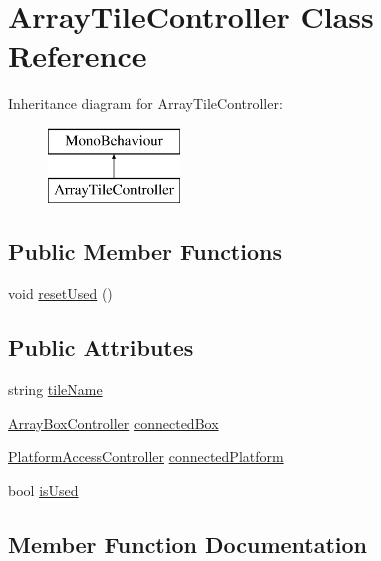 \hypertarget{class_array_tile_controller}{}\section{Array\+Tile\+Controller Class Reference}
\label{class_array_tile_controller}
Inheritance diagram for Array\+Tile\+Controller\+:\begin{figure}[H]
\begin{center}
\leavevmode
\includegraphics[height=2.000000cm]{class_array_tile_controller}
\end{center}
\end{figure}
\subsection*{Public Member Functions}
\begin{DoxyCompactItemize}
\item 
void \hyperlink{class_array_tile_controller_ab8f5d31d582f80a87d6e7ffca8dd9dce}{reset\+Used} ()
\end{DoxyCompactItemize}
\subsection*{Public Attributes}
\begin{DoxyCompactItemize}
\item 
string \hyperlink{class_array_tile_controller_a9f7d6d4fd87723a3e91209f35bc8d5f6}{tile\+Name}
\item 
\hyperlink{class_array_box_controller}{Array\+Box\+Controller} \hyperlink{class_array_tile_controller_a2ad475baebfedaf0690af41e9a243b01}{connected\+Box}
\item 
\hyperlink{class_platform_access_controller}{Platform\+Access\+Controller} \hyperlink{class_array_tile_controller_aadb469bbd5a6e7ae326b5935e50ccd8a}{connected\+Platform}
\item 
bool \hyperlink{class_array_tile_controller_a3a6ff99fac5882cc1db2be7776818e43}{is\+Used}
\end{DoxyCompactItemize}


\subsection{Member Function Documentation}
\mbox{\label{class_array_tile_controller_ab8f5d31d582f80a87d6e7ffca8dd9dce}} 
